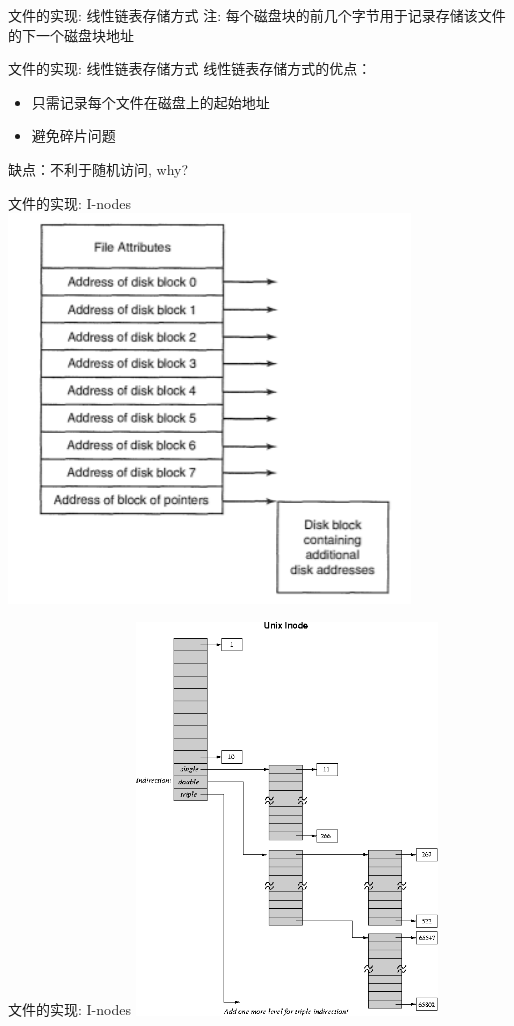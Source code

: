 \documentclass[xcolor=svgnames]{beamer}
\begin{document}
\begin{CJK*}{UTF8}{gbsn}
\begin{frame}{文件的实现: 线性链表存储方式}
\alert{注}: 每个磁盘块的前几个字节用于记录存储该文件的下一个磁盘块地址
\end{frame}

\begin{frame}{文件的实现: 线性链表存储方式}
线性链表存储方式的优点：
\begin{itemize}
\item 只需记录每个文件在磁盘上的起始地址
\item 避免碎片问题
\end{itemize}

缺点：不利于随机访问, why?
\end{frame}

\begin{frame}{文件的实现: I-nodes}
\includegraphics[width=0.8\textwidth]{inodes.png}
\end{frame}

\begin{frame}{文件的实现: I-nodes}
\includegraphics[width=0.6\textwidth]{inode22.png}
\end{frame}


\end{CJK*}
\end{document}
